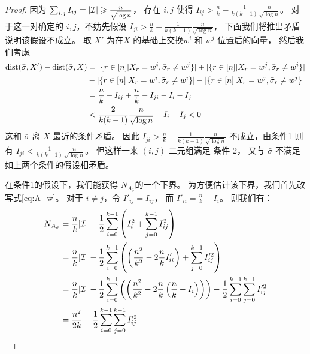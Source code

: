 \begin{proof}
    因为 $\sum_{i,j} I_{ij} = |\mathcal{I}| \geqslant \frac{n}{\sqrt{\log n}}$，
    存在 $i,j$ 使得
    $I_{ij} > \frac{n}{k} - \frac{1}{k(k-1)}\frac{n}{\sqrt{\log n}}$。
    对于这一对确定的 $i,j$，不妨先假设 $I_{ji} > \frac{n}{k} - \frac{1}{k(k-1)}\frac{n}{\sqrt{\log n}}$，
    下面我们将推出矛盾说明该假设不成立。
    取 $X'$ 为在$X$ 的基础上交换$w^i$ 和 $w^j$ 位置后的向量，
    然后我们考虑
  \begin{align}
     \operatorname{dist}(\bar{\sigma}, X')  - \operatorname{dist}(\bar{\sigma}, X)
     &= |\{ r \in [n]|X_r=w^i, \bar{\sigma}_r \neq w^j \}| 
     + |\{ r \in [n]|X_r=w^j, \bar{\sigma}_r \neq w^i \}|\notag\\ 
    &-|\{ r \in [n]|X_r=w^i, \bar{\sigma}_r \neq w^i \}| 
    - |\{ r \in [n]|X_r=w^j, \bar{\sigma}_r \neq w^j \}| \notag\\
    & = \frac{n}{k} - I_{ij} +  \frac{n}{k} - I_{ji} - I_i - I_j\label{eq:distsmall} \\
    & < \frac{2}{k(k-1)}\frac{n}{\sqrt{\log n}} - I_i - I_j < 0\notag
    \end{align}
    这和 $\bar{\sigma}$ 离 $X$ 最近的条件矛盾。
    因此
    $I_{ji} > \frac{n}{k} - \frac{1}{k(k-1)}\frac{n}{\sqrt{\log n}}$
    不成立，由条件1
    则有  $I_{ji} < \frac{1}{k(k-1)}\frac{n}{\sqrt{\log n}}$。
    但这样一来 $(i, j)$ 二元组满足 条件 2，
    又与 $\bar{\sigma}$ 不满足如上两个条件的假设相矛盾。
    
    在条件1的假设下，我们能获得 $N_{A_{\bar{\sigma}}}$的一个下界。
    为方便估计该下界，我们首先改写式\eqref{eq:A_w}。
    对于 $i\neq j$，令 $I'_{ij} = I_{ij}$，
    而 $I'_{ii} = \frac{n}{k} - I_i$。
    则我们有：
    \begin{align*}
    N_{A_{\bar{\sigma}}} &=
    \frac{n}{k}|\mathcal{I}| - \frac{1}{2}\sum_{i=0}^{k-1}
    \left(I^2_i + \sum_{j=0}^{k-1} I^2_{ij} \right) \\
    &=
    \frac{n}{k}|\mathcal{I}| - \frac{1}{2}\sum_{i=0}^{k-1}
    \left(\left(\frac{n^2}{k^2} - 2\frac{n}{k} I'_{ii} \right) +
    \sum_{j=0}^{k-1} I'^2_{ij} \right) \\
    &=
    \frac{n}{k}|\mathcal{I}| - \frac{1}{2}\sum_{i=0}^{k-1}
    \left(\left(\frac{n^2}{k^2} - 2\frac{n}{k} \left(\frac{n}{k} - I_i\right)\right)\right)
    - \frac{1}{2}\sum_{i=0}^{k-1}\sum_{j=0}^{k-1} I'^2_{ij} \\
    &= \frac{n^2}{2k} - \frac{1}{2}
    \sum_{i=0}^{k-1} \sum_{j=0}^{k-1} I'^2_{ij}
   \end{align*}
    

\end{proof}
